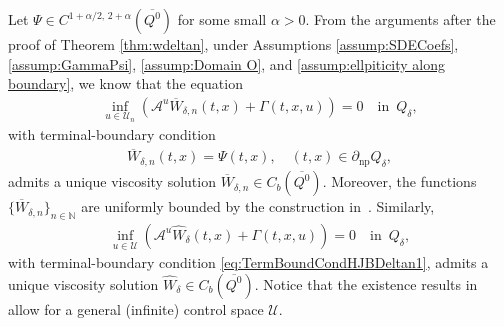 \documentclass[amscd,amssymb,11pt]{article}
\numberwithin{theorem}{section}
\numberwithin{equation}{section}
\begin{document}
Let $\Psi\in C^{1+\alpha/2,\,2+\alpha}(\overline{Q^{0}})$ for some small $\alpha>0$. From the arguments after the proof of Theorem \ref{thm:wdeltan}, under Assumptions \ref{assump:SDECoefs}, \ref{assump:GammaPsi}, \ref{assump:Domain O}, and \ref{assump:ellpiticity along boundary}, we know that the equation
\begin{align}\label{eq:HJBTildeDeltan}
\inf_{u\in\mathcal{U}_{n}}\left(\mathscr{A}^{u}\overline{W}_{\delta,n}(t,x)+\Gamma(t,x,u)\right)=0\quad\text{in }\,Q_{\delta},
\end{align}
with terminal-boundary condition
\begin{align}\label{eq:TermBoundCondHJBDeltan1}
\overline{W}_{\delta,n}(t,x)=\Psi(t,x),\quad (t,x)\in\partial_{\text{np}}Q_{\delta},
\end{align}
admits a unique viscosity solution $\overline{W}_{\delta,n}\in C_{b}(\overline{Q^{0}})$. Moreover, the functions $\{\overline{W}_{\delta,n}\}_{n\in\mathbb{N}}$ are uniformly bounded by the construction in~\cite[Theorem 3.2]{Mou:2017}. Similarly,
\begin{align}\label{eq:HJBDelta1}
\inf_{u\in\mathcal{U}}\left(\mathscr{A}^{u}\widehat{W}_{\delta}(t,x)+\Gamma(t,x,u)\right)=0\quad\text{in }\,Q_{\delta},
\end{align}
with terminal-boundary condition \eqref{eq:TermBoundCondHJBDeltan1}, admits a unique viscosity solution $\widehat{W}_{\delta}\in C_{b}(\overline{Q^{0}})$. Notice that the existence results in \cite{Mou1:2016} allow for a general (infinite) control space $\mathcal{U}$.
\end{document}
